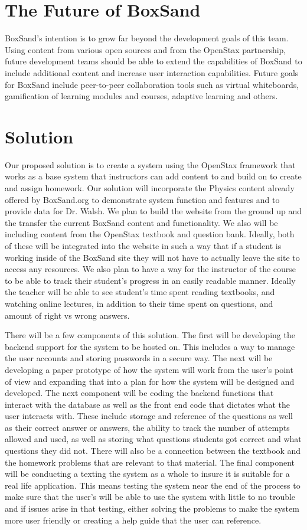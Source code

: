 \documentclass[onecolumn, draftclsnofoot,10pt, compsoc]{IEEEtran}
\begin{document}
\section{The Future of BoxSand}
BoxSand’s intention is to grow far beyond the development goals of this team. Using content from various open sources and from the OpenStax partnership, future development teams should be able to extend the capabilities of BoxSand to include additional content and increase user interaction capabilities. Future goals for BoxSand include peer-to-peer collaboration tools such as virtual whiteboards, gamification of learning modules and courses, adaptive learning and others.

\section{Solution}
Our proposed solution is to create a system using the OpenStax framework that works as a base system that instructors can add content to and build on to create and assign homework. Our solution will incorporate the Physics content already offered by BoxSand.org to demonstrate system function and features and to provide data for Dr. Walsh. We plan to build the website from the ground up and the transfer the current BoxSand content and functionality. We also will be including content from the OpenStax textbook and question bank. Ideally, both of these will be integrated into the website in such a way that if a student is working inside of the BoxSand site they will not have to actually leave the site to access any resources. We also plan to have a way for the instructor of the course to be able to track their student’s progress in an easily readable manner. Ideally the teacher will be able to see student’s time spent reading textbooks, and watching online lectures, in addition to their time spent on questions, and amount of right vs wrong answers.	

There will be a few components of this solution. The first will be developing the backend support for the system to be hosted on. This includes a way to manage the user accounts and storing passwords in a secure way. The next will be developing a paper prototype of how the system will work from the user’s point of view and expanding that into a plan for how the system will be designed and developed. The next component will be coding the backend functions that interact with the database as well as the front end code that dictates what the user interacts with. These include storage and reference of the questions as well as their correct answer or answers, the ability to track the number of attempts allowed and used, as well as storing what questions students got correct and what questions they did not. There will also be a connection between the textbook and the homework problems that are relevant to that material. The final component will be conducting a texting the system as a whole to insure it is suitable for a real life application. This means testing the system near the end of the process to make sure that the user’s will be able to use the system with little to no trouble and if issues arise in that testing, either solving the problems to make the system more user friendly or creating a help guide that the user can reference. 
\end{document}
